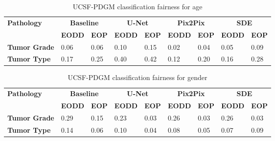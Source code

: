 \begin{table}[]
    \centering
    \caption{UCSF-PDGM classification fairness for age}\label{tab:ucsf_age}
    \begin{tabular}{l|llllllll}
    \hline
    \multirow{2}{*}{\textbf{Pathology}} & \multicolumn{2}{c|}{\textbf{Baseline}}                   & \multicolumn{2}{c|}{\textbf{U-Net}}                              & \multicolumn{2}{c|}{\textbf{Pix2Pix}}                              & \multicolumn{2}{c}{\textbf{SDE}}    \\ \cline{2-9}
                                                                                       & \textbf{EODD} & \textbf{EOP}  & \textbf{EODD} & \textbf{EOP}  & \textbf{EODD} & \textbf{EOP} & \textbf{EODD} & \textbf{EOP} \\ \hline
                                                                \textbf{Tumor Grade}  & 0.06 & 0.06 & 0.10 & 0.15 & 0.02 & 0.04 & 0.05 & 0.09 \\        
                                                              \textbf{Tumor Type} & 0.17 & 0.25 & 0.40 & 0.42 & 0.12 & 0.20 & 0.16 & 0.28 \\ \hline
    \end{tabular}
    \end{table}
    
    \begin{table}[]
        \centering
        \caption{UCSF-PDGM classification fairness for gender}\label{tab:ucsf_gender}
        \begin{tabular}{l|llllllll}
        \hline
        \multirow{2}{*}{\textbf{Pathology}} & \multicolumn{2}{c|}{\textbf{Baseline}}                   & \multicolumn{2}{c|}{\textbf{U-Net}}                              & \multicolumn{2}{c|}{\textbf{Pix2Pix}}                              & \multicolumn{2}{c}{\textbf{SDE}}    \\ \cline{2-9}
                                                                                           & \textbf{EODD} & \textbf{EOP}  & \textbf{EODD} & \textbf{EOP}  & \textbf{EODD} & \textbf{EOP} & \textbf{EODD} & \textbf{EOP} \\ \hline
                                                                    \textbf{Tumor Grade}  & 0.29 & 0.15 & 0.23 & 0.03 & 0.26 & 0.03 & 0.26 & 0.03 \\        
                                                                  \textbf{Tumor Type} & 0.14 & 0.06 & 0.10 & 0.04 & 0.08 & 0.05 & 0.07 & 0.09 \\ \hline
        \end{tabular}
        \end{table}
    
